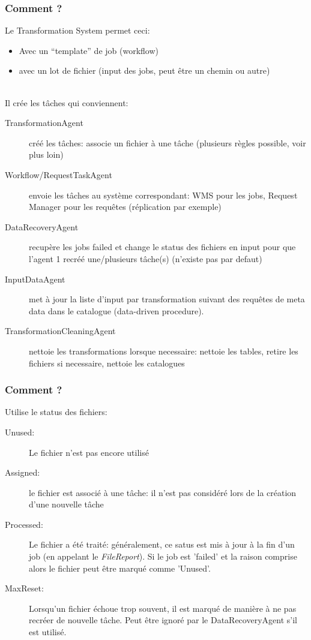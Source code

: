 \documentclass[10pt,table,dvipsnames]{beamer}
\begin{document}
\begin{frame}
  \frametitle{Comment ?}
Le Transformation System permet ceci:
\begin{itemize}
\item Avec un ``template'' de job (workflow)
\item avec un lot de fichier (input des jobs, peut \^etre un chemin ou autre)
\end{itemize}
~\\
Il cr\'ee les t\^aches qui conviennent:
\begin{description}
\item[TransformationAgent] cr\'e\'e les t\^aches: associe un fichier \`a une t\^ache
  (plusieurs r\`egles possible, voir plus loin)
\item[Workflow/RequestTaskAgent] envoie les t\^aches au syst\`eme correspondant: WMS pour les
  jobs, Request Manager pour les requ\^etes (r\'eplication par exemple)
\item[DataRecoveryAgent] recup\`ere les jobs failed et change le status des fichiers
  en input pour que l'agent 1 recr\'e\'e une/plusieurs t\^ache(s)
  (n'existe pas par defaut)
\item[InputDataAgent] met \`a jour la liste d'input par transformation suivant
  des requ\^etes de meta data dans le catalogue (data-driven procedure).
\item[TransformationCleaningAgent] nettoie les transformations lorsque
  necessaire: nettoie les tables, retire les fichiers si necessaire,
  nettoie les catalogues
\end{description}
\end{frame}

\begin{frame}
  \frametitle{Comment ?}
Utilise le status des fichiers:
\begin{description}
\item[Unused:] Le fichier n'est pas encore utilis\'e
\item[Assigned:] le fichier est associ\'e \`a une t\^ache: il n'est
  pas consid\'er\'e lors de la cr\'eation d'une nouvelle t\^ache
\item[Processed:] Le fichier a \'et\'e trait\'e: g\'en\'eralement, ce
  satus est mis \`a jour \`a la fin d'un job (en appelant le
  \emph{FileReport}). Si le job est 'failed' et la raison comprise alors le fichier peut
  \^etre marqu\'e comme 'Unused'.
\item[MaxReset:] Lorsqu'un fichier \'echoue trop souvent, il est
  marqu\'e de mani\`ere \`a ne pas recr\'eer de nouvelle t\^ache. Peut
  \^etre ignor\'e par le DataRecoveryAgent s'il est utilis\'e.
\end{description}
\end{frame}
\end{document}
